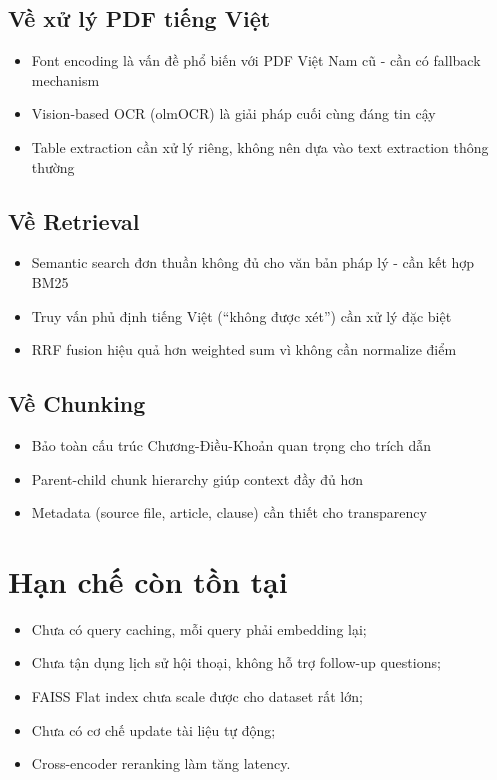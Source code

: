 \documentclass[../DoAn.tex]{subfiles}
\begin{document}
\subsection{Về xử lý PDF tiếng Việt}
\begin{itemize}
    \item Font encoding là vấn đề phổ biến với PDF Việt Nam cũ - cần có fallback mechanism
    \item Vision-based OCR (olmOCR) là giải pháp cuối cùng đáng tin cậy
    \item Table extraction cần xử lý riêng, không nên dựa vào text extraction thông thường
\end{itemize}

\subsection{Về Retrieval}
\begin{itemize}
    \item Semantic search đơn thuần không đủ cho văn bản pháp lý - cần kết hợp BM25
    \item Truy vấn phủ định tiếng Việt (``không được xét'') cần xử lý đặc biệt
    \item RRF fusion hiệu quả hơn weighted sum vì không cần normalize điểm
\end{itemize}

\subsection{Về Chunking}
\begin{itemize}
    \item Bảo toàn cấu trúc Chương-Điều-Khoản quan trọng cho trích dẫn
    \item Parent-child chunk hierarchy giúp context đầy đủ hơn
    \item Metadata (source file, article, clause) cần thiết cho transparency
\end{itemize}

\section{Hạn chế còn tồn tại}

\begin{itemize}
    \item Chưa có query caching, mỗi query phải embedding lại;
    \item Chưa tận dụng lịch sử hội thoại, không hỗ trợ follow-up questions;
    \item FAISS Flat index chưa scale được cho dataset rất lớn;
    \item Chưa có cơ chế update tài liệu tự động;
    \item Cross-encoder reranking làm tăng latency.
\end{itemize}
\end{document}
